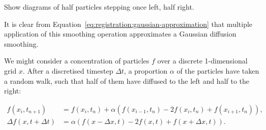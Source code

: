  Show diagrams of half particles stepping once left, half right.
  
  It is clear from Equation~\ref{eq:registration:gaussian-approximation} that multiple application of this smoothing operation approximates a Gaussian diffusion smoothing.

  
  We might consider a concentration of particles $f$ over a discrete 1-dimensional grid $x$. After a discretised timestep $\Delta t$, a proportion $\alpha$ of the particles have taken a random walk, such that half of them have diffused to the left and half to the right:
  
  \begin{align}
    f(x_i, t_{n+1}) &= f(x_i, t_n) + \alpha (f(x_{i-1}, t_n) - 2f(x_i, t_n) + f(x_{i+1}, t_n)), \\
    \Delta f(x, t + \Delta t) &= \alpha (f(x - \Delta x, t) - 2f(x, t) + f(x + \Delta x, t)). \end{align}
  
